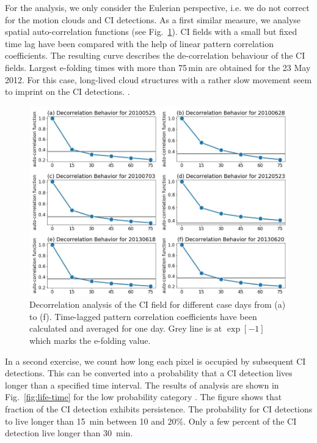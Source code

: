 For the  analysis, we only consider the Eulerian perspective, i.e. we do not correct for the motion  clouds and  CI detections. As a first similar measure, we analyse spatial auto-correlation functions (see Fig.~\ref{fig:decorr_analysis}). CI fields with a small but fixed time lag have been compared with the help of linear pattern correlation coefficients. The resulting curve describes the de-correlation behaviour of the CI fields. Largest e-folding times with more than 75\,min are obtained for the 23 May 2012. For this case, long-lived cloud structures with a rather slow movement seem to imprint on the CI detections.   \citep{Senf.Deneke_2017_JAMC}. 

\begin{figure}
\centering
\includegraphics[width=\textwidth]{Grafiken/Abbildungen/decorrelation_CI.jpg}
\caption{Decorrelation analysis of the CI field for different case days from (a) to (f). Time-lagged pattern correlation coefficients have been calculated and averaged for one day. Grey line is at $\exp[-1]$ which marks the e-folding value. }
\label{fig:decorr_analysis}
\end{figure}

In a second exercise, we count how long each pixel is occupied by subsequent CI detections. This can be converted into a probability that a CI detection lives longer than a specified time interval. The results of  analysis are shown in Fig.~\ref{fig:life-time} for the low probability category \annote[JMM]{$>25\%$}{Do you mean $]25,50]$?}. The figure shows that  fraction of the CI detection exhibits persistence. The probability for CI detections to live longer than 15~min  between 10 and 20\%. Only a few percent of the CI detection live longer than 30~min.

